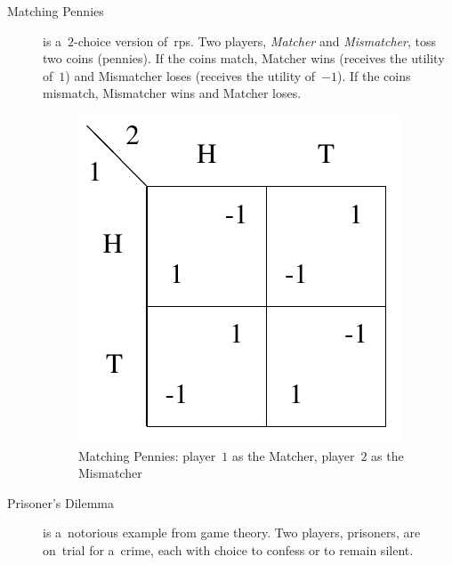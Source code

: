 \begin{description}
  \item [Matching Pennies] is a~$2$-choice version of~\acrshort{rps}.
    Two players, \emph{Matcher} and \emph{Mismatcher}, toss two coins (pennies).
    If the coins match, Matcher wins (receives the utility of~$1$) and Mismatcher loses (receives the utility of~$-1$).
    If the coins mismatch, Mismatcher wins and Matcher loses.
    \begin{figure}[H]
      \centering
      \includegraphics[width=.3\textwidth]{../img/matching-pennies.png}
      \caption[Matching Pennies]{Matching Pennies: player~$1$ as the Matcher, player~$2$ as the Mismatcher}
      \label{fig:matching-pennies}
    \end{figure}

  \item [Prisoner's Dilemma] is a~notorious example from game theory.
    Two players, prisoners, are on~trial for a~crime, each with choice to confess or to remain silent.


\end{description}
